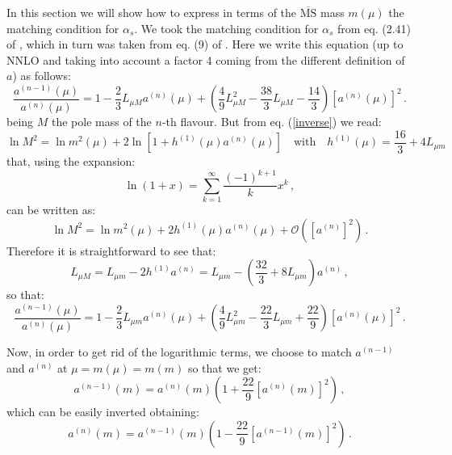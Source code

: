 \documentclass[10pt,a4paper]{article}
\begin{document}
In this section we will show how to express in terms of the $\overline{\mbox{MS}}$ mass $m(\mu)$ the matching condition for $\alpha_s$. We took the matching condition for $\alpha_s$ from eq. (2.41) of \cite{Vogt:2004ns}, which in turn was taken from eq. (9) of \cite{Chetyrkin:1997sg}.  Here we write this equation (up to NNLO and taking into account a factor 4 coming from the different definition of $a$) as follows:
\begin{equation}
\frac{a^{(n-1)}(\mu)}{a^{(n)}(\mu)}=1-\frac23 L_{\mu
  M}a^{(n)}(\mu)+\left(\frac49L_{\mu M}^2-\frac{38}3L_{\mu
    M}-\frac{14}3\right)[a^{(n)}(\mu)]^2\,.
\label{alphaspole}
\end{equation}
being $M$ the pole mass of the $n$-th flavour. But from eq. (\ref{inverse}) we read:
\begin{equation}
\ln M^2 = \ln m^2(\mu) + 2\ln[1+h^{(1)}(\mu)a^{(n)}(\mu)]\quad\mbox{with}\quad h^{(1)}(\mu) = \frac{16}3+4L_{\mu m}
\end{equation}
that, using the expansion:
\begin{equation}
\ln(1+x)=\sum_{k=1}^{\infty}\frac{(-1)^{k+1}}{k}x^k\,,
\end{equation}
can be written as:
\begin{equation}
\ln M^2 = \ln m^2(\mu) +
2h^{(1)}(\mu)a^{(n)}(\mu)+\mathcal{O}([a^{(n)}]^2)\,.
\label{cacchiocacchio}
\end{equation}
Therefore it is straightforward to see that:
\begin{equation}
L_{\mu M}  = L_{\mu m} - 2h^{(1)}a^{(n)}=L_{\mu m}-\left(\frac{32}3+8L_{\mu m}\right)a^{(n)}\,,
\end{equation}
so that:
\begin{equation}
\frac{a^{(n-1)}(\mu)}{a^{(n)}(\mu)}=1-\frac23 L_{\mu
  m}a^{(n)}(\mu)+\left(\frac49L_{\mu m}^2-\frac{22}3L_{\mu
    m}+\frac{22}9\right)[a^{(n)}(\mu)]^2\,.
\label{alphasmsbar}
\end{equation}

Now, in order to get rid of the logarithmic terms, we choose to match $a^{(n-1)}$ and $a^{(n)}$ at $\mu=m(\mu)=m(m)$ so that we get:
\begin{equation}
a^{(n-1)}(m)=a^{(n)}(m)\left(1+\frac{22}9[a^{(n)}(m)]^2\right)\,,
\end{equation}
which can be easily inverted obtaining:
\begin{equation}
a^{(n)}(m)=a^{(n-1)}(m)\left(1-\frac{22}9[a^{(n-1)}(m)]^2\right)\,.
\label{pollopollo}
\end{equation}
\end{document}
